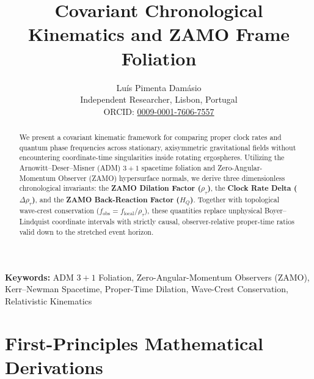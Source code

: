 \documentclass[11pt,a4paper]{article}
\title{\textbf{Covariant Chronological Kinematics and ZAMO Frame Foliation}}
\author{Luís {Pimenta Damásio}\\
\small Independent Researcher, Lisbon, Portugal\\
\small ORCID: \href{https://orcid.org/0009-0001-7606-7557}{0009-0001-7606-7557}}
\date{}
\begin{document}
\maketitle

\begin{abstract}
We present a covariant kinematic framework for comparing proper clock rates and quantum phase frequencies across stationary, axisymmetric gravitational fields without encountering coordinate-time singularities inside rotating ergospheres. Utilizing the Arnowitt--Deser--Misner (ADM) $3+1$ spacetime foliation and Zero-Angular-Momentum Observer (ZAMO) hypersurface normals, we derive three dimensionless chronological invariants: the \textbf{ZAMO Dilation Factor ($\rho_\tau$)}, the \textbf{Clock Rate Delta ($\Delta\rho_\tau$)}, and the \textbf{ZAMO Back-Reaction Factor ($H_Q$)}. Together with topological wave-crest conservation ($f_{\text{obs}} = f_{\text{local}} / \rho_\tau$), these quantities replace unphysical Boyer--Lindquist coordinate intervals with strictly causal, observer-relative proper-time ratios valid down to the stretched event horizon.
\end{abstract}

\noindent\textbf{Keywords:} ADM $3+1$ Foliation, Zero-Angular-Momentum Observers (ZAMO), Kerr--Newman Spacetime, Proper-Time Dilation, Wave-Crest Conservation, Relativistic Kinematics

\vspace{0.8em}
\noindent{}
\vspace{1em}

\section{First-Principles Mathematical Derivations}
\end{document}
